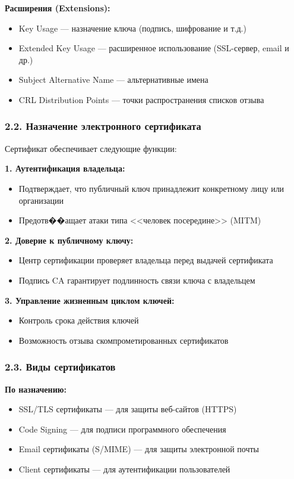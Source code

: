 \textbf{Расширения (Extensions):}
\begin{itemize}
    \item Key Usage — назначение ключа (подпись, шифрование и т.д.)
    \item Extended Key Usage — расширенное использование (SSL-сервер, email и др.)
    \item Subject Alternative Name — альтернативные имена
    \item CRL Distribution Points — точки распространения списков отзыва
\end{itemize}

\subsubsection*{2.2. Назначение электронного сертификата}

Сертификат обеспечивает следующие функции:

\textbf{1. Аутентификация владельца:}
\begin{itemize}
    \item Подтверждает, что публичный ключ принадлежит конкретному лицу или организации
    \item Предотв��ащает атаки типа <<человек посередине>> (MITM)
\end{itemize}

\textbf{2. Доверие к публичному ключу:}
\begin{itemize}
    \item Центр сертификации проверяет владельца перед выдачей сертификата
    \item Подпись CA гарантирует подлинность связи ключа с владельцем
\end{itemize}

\textbf{3. Управление жизненным циклом ключей:}
\begin{itemize}
    \item Контроль срока действия ключей
    \item Возможность отзыва скомпрометированных сертификатов
\end{itemize}

\subsubsection*{2.3. Виды сертификатов}

\textbf{По назначению:}
\begin{itemize}
    \item SSL/TLS сертификаты — для защиты веб-сайтов (HTTPS)
    \item Code Signing — для подписи программного обеспечения
    \item Email сертификаты (S/MIME) — для защиты электронной почты
    \item Client сертификаты — для аутентификации пользователей
\end{itemize}

